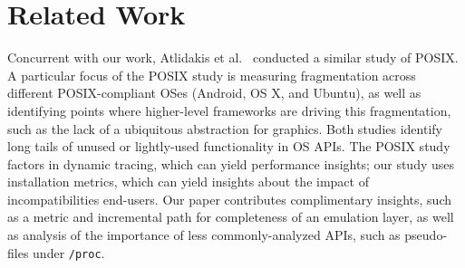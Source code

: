 \section{Related Work}
\label{sec:related}


Concurrent with our work, Atlidakis et al.~\citep{atlidakis16posix} conducted a similar 
study of POSIX.
A particular focus of the POSIX study is measuring fragmentation across different POSIX-compliant OSes
(Android, OS X, and Ubuntu), as well as identifying points where higher-level frameworks
are driving this fragmentation, such as the lack of a ubiquitous abstraction for graphics.
Both studies identify long tails of unused or lightly-used functionality in OS APIs.
The POSIX study factors in dynamic tracing, which can yield performance insights;
our study uses installation metrics, which can yield insights about the impact of incompatibilities end-users.
Our paper contributes complimentary insights, such as a metric and incremental path for 
completeness of an emulation layer, as well as analysis of the importance of less commonly-analyzed 
APIs, such as pseudo-files under {\tt /proc}.


